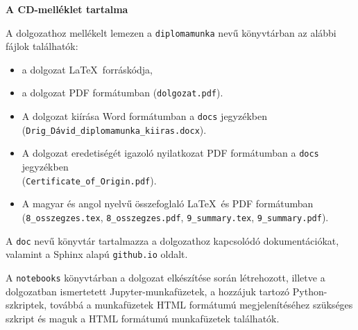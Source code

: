 \pagestyle{empty}

\noindent \textbf{\Large A CD-melléklet tartalma}

\vskip 1cm

\noindent A dolgozathoz mellékelt lemezen a \texttt{diplomamunka} nevű könyvtárban az alábbi fájlok találhatók:

\begin{itemize}
\item a dolgozat \LaTeX\ forráskódja,
\item a dolgozat PDF formátumban (\texttt{dolgozat.pdf}).
\item A dolgozat kiírása Word formátumban a \texttt{docs} jegyzékben \\ (\texttt{Drig\_Dávid\_diplomamunka\_kiiras.docx}).
\item A dolgozat eredetiségét igazoló nyilatkozat PDF formátumban a \texttt{docs} jegyzékben \\ (\texttt{Certificate\_of\_Origin.pdf}).
\item A magyar és angol nyelvű összefoglaló \LaTeX\ és PDF formátumban \\ (\texttt{8\_osszegzes.tex}, \texttt{8\_osszegzes.pdf}, \texttt{9\_summary.tex}, \texttt{9\_summary.pdf}).
\end{itemize}

A \texttt{doc} nevű könyvtár tartalmazza a dolgozathoz kapcsolódó dokumentációkat, valamint a Sphinx alapú \texttt{github.io} oldalt.

A \texttt{notebooks} könyvtárban a dolgozat elkészítése során létrehozott, illetve a dolgozatban ismertetett Jupyter-munkafüzetek, a hozzájuk tartozó Python-szkriptek, továbbá a munkafüzetek HTML formátumú megjelenítéséhez szükséges szkript és maguk a HTML formátumú munkafüzetek találhatók.
